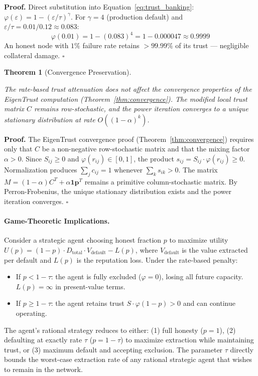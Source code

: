 \documentclass[11pt]{article}
\newtheorem{theorem}{Theorem}[section]
\newcommand{\qed}{\hfill}
\newenvironment{proof}{\noindent\textbf{Proof.}}{\qed$\square$\par\medskip}
\begin{document}
\begin{proof}
Direct substitution into Equation~\eqref{eq:trust_banking}: $\varphi(\varepsilon) = 1 - (\varepsilon/\tau)^\gamma$. For $\gamma = 4$ (production default) and $\varepsilon/\tau = 0.01/0.12 \approx 0.083$:
\[
    \varphi(0.01) = 1 - (0.083)^4 = 1 - 0.000047 \approx 0.9999
\]
An honest node with $1\%$ failure rate retains $>99.99\%$ of its trust --- negligible collateral damage. \qed
\end{proof}

\begin{theorem}[Convergence Preservation]\label{thm:convergence_preservation}
\begin{sloppypar}
The rate-based trust attenuation does not affect the convergence properties of the EigenTrust computation (Theorem~\ref{thm:convergence}). The modified local trust matrix $C$ remains row-stochastic, and the power iteration converges to a unique stationary distribution at rate $O((1-\alpha)^k)$.
\end{sloppypar}
\end{theorem}

\begin{proof}
The EigenTrust convergence proof (Theorem~\ref{thm:convergence}) requires only that $C$ be a non-negative row-stochastic matrix and that the mixing factor $\alpha > 0$. Since $S_{ij} \geq 0$ and $\varphi(r_{ij}) \in [0, 1]$, the product $s_{ij} = S_{ij} \cdot \varphi(r_{ij}) \geq 0$. Normalization produces $\sum_j c_{ij} = 1$ whenever $\sum_k s_{ik} > 0$. The matrix $M = (1-\alpha)C^T + \alpha \mathbf{1}\mathbf{p}^T$ remains a primitive column-stochastic matrix. By Perron-Frobenius, the unique stationary distribution exists and the power iteration converges. \qed
\end{proof}

\paragraph{Game-Theoretic Implications.}
\begin{sloppypar}
Consider a strategic agent choosing honest fraction $p$ to maximize utility $U(p) = (1-p) \cdot D_{\text{total}} \cdot V_{\text{default}} - L(p)$, where $V_{\text{default}}$ is the value extracted per default and $L(p)$ is the reputation loss. Under the rate-based penalty:
\end{sloppypar}
\begin{itemize}
    \item If $p < 1 - \tau$: the agent is fully excluded ($\varphi = 0$), losing all future capacity. $L(p) = \infty$ in present-value terms.
    \item If $p \geq 1 - \tau$: the agent retains trust $S \cdot \varphi(1-p) > 0$ and can continue operating.
\end{itemize}
The agent's rational strategy reduces to either: (1) full honesty ($p = 1$), (2) defaulting at exactly rate $\tau$ ($p = 1 - \tau$) to maximize extraction while maintaining trust, or (3) maximum default and accepting exclusion. The parameter $\tau$ directly bounds the worst-case extraction rate of any rational strategic agent that wishes to remain in the network.
\end{document}
